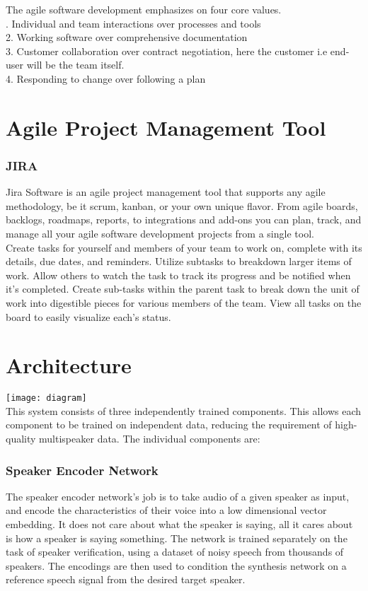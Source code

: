 \documentclass[12pt]{report}
\begin{document}
The agile software development emphasizes on four core values.\\

. Individual and team interactions over processes and tools\\
2. Working software over comprehensive documentation\\
3. Customer collaboration over contract negotiation, here the customer i.e end-user will be the team itself.\\
4. Responding to change over following a plan\\

\section{Agile Project Management Tool}
\subsubsection{JIRA}
Jira Software is an agile project management tool that supports any agile methodology, be it scrum, kanban, or your own unique flavor. From agile boards, backlogs, roadmaps, reports, to integrations and add-ons you can plan, track, and manage all your agile software development projects from a single tool.\\

Create tasks for yourself and members of your team to work on, complete with its details, due dates, and reminders. Utilize subtasks to breakdown larger items of work. Allow others to watch the task to track its progress and be notified when it’s completed. Create sub-tasks within the parent task to break down the unit of work into digestible pieces for various members of the team. View all tasks on the board to easily visualize each’s status.\\

\section{Architecture}
\texttt{[image: diagram]}\\
This system consists of three independently trained components. This allows each component to be trained on independent data, reducing the requirement of high-quality multispeaker data. The individual components are:\\

\subsubsection{Speaker Encoder Network} The speaker encoder network’s job is to take audio of a given speaker as input, and encode the characteristics of their voice into a low dimensional vector embedding. It does not care about what the speaker is saying, all it cares about is how a speaker is saying something. The network is trained separately on the task of speaker verification, using a dataset of noisy speech from thousands of speakers. The encodings are then used to condition the synthesis network on a reference speech signal from the desired target speaker.\\
\end{document}

